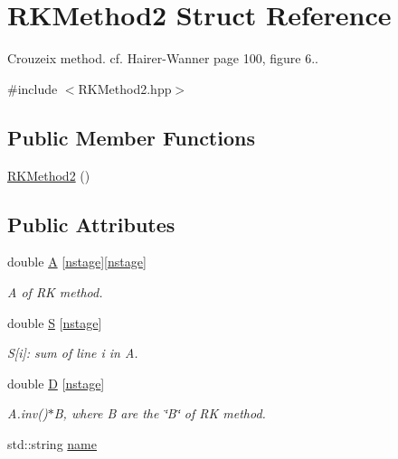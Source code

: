 \hypertarget{structRKMethod2}{\section{R\-K\-Method2 Struct Reference}
\label{structRKMethod2}
}


Crouzeix method. cf. Hairer-\/\-Wanner page 100, figure 6..  




{\ttfamily \#include $<$R\-K\-Method2.\-hpp$>$}

\subsection*{Public Member Functions}
\begin{DoxyCompactItemize}
\item 
\hyperlink{structRKMethod2_af7b70a13172a29dcf86dc722dd2707b9}{R\-K\-Method2} ()
\end{DoxyCompactItemize}
\subsection*{Public Attributes}
\begin{DoxyCompactItemize}
\item 
double \hyperlink{structRKMethod2_ab96def86a2c9ebf2f3195f1cc7079230}{A} \mbox{[}\hyperlink{structRKMethod2_ac7659bcba97246c2f9912d86655fc08f}{nstage}\mbox{]}\mbox{[}\hyperlink{structRKMethod2_ac7659bcba97246c2f9912d86655fc08f}{nstage}\mbox{]}
\begin{DoxyCompactList}\small\item\em A of R\-K method. \end{DoxyCompactList}\item 
double \hyperlink{structRKMethod2_a90c9315231c3a7e4273989ef795cd42f}{S} \mbox{[}\hyperlink{structRKMethod2_ac7659bcba97246c2f9912d86655fc08f}{nstage}\mbox{]}
\begin{DoxyCompactList}\small\item\em S\mbox{[}i\mbox{]}\-: sum of line i in A. \end{DoxyCompactList}\item 
double \hyperlink{structRKMethod2_a011951cc287f7df3cb76f8827217e0d5}{D} \mbox{[}\hyperlink{structRKMethod2_ac7659bcba97246c2f9912d86655fc08f}{nstage}\mbox{]}
\begin{DoxyCompactList}\small\item\em A.\-inv()$\ast$\-B, where B are the \char`\"{}\-B\char`\"{} of R\-K method. \end{DoxyCompactList}\item 
std\-::string \hyperlink{structRKMethod2_a804f6222e9e48ba6a8ec4b1f4ecf39ea}{name}
\end{DoxyCompactItemize}
